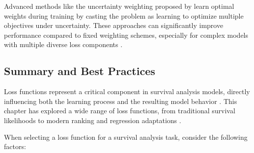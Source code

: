 Advanced methods like the uncertainty weighting proposed by \textcite{kendall2018} learn optimal weights during training by casting the problem as learning to optimize multiple objectives under uncertainty. These approaches can significantly improve performance compared to fixed weighting schemes, especially for complex models with multiple diverse loss components \parencite{fotso2018}.

\subsection{Summary and Best Practices}

Loss functions represent a critical component in survival analysis models, directly influencing both the learning process and the resulting model behavior \parencite{lee2018,kvamme2019,nagpal2021dsm}. This chapter has explored a wide range of loss functions, from traditional survival likelihoods to modern ranking and regression adaptations \parencite{harrell1982,ibrahim2001,kvamme2021survrnc}.

When selecting a loss function for a survival analysis task, consider the following factors:


